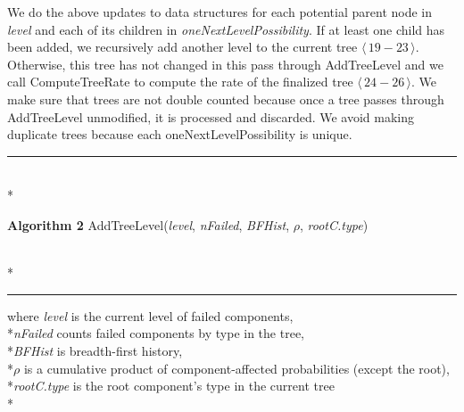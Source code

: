 \documentclass[12pt]{article}
\newcommand{\captionAmerica}[2]{\noindent\hrLine\vspace{-0.25em}\\*{\raggedright\textbf{Algorithm #1} #2}\vspace{-0.8em}\\*\hrLine}
\newcommand{\hrLine}{\hspace{\fill}\rule{1.0\linewidth}{0.7pt}\hspace{\fill}}
\newcommand{\varName}[1]{\textrm{\it#1}}
\newcommand{\citeBlock}[2]{$\langle \, #1 - #2 \, \rangle$}
\begin{document}
We do the above updates to data structures for each potential parent node in \varName{level} and each of its children in \varName{oneNextLevelPossibility}. If at least one child has been added, we recursively add another level to the current tree \citeBlock{19}{23}. Otherwise, this tree has not changed in this pass through AddTreeLevel and we call ComputeTreeRate to compute the rate of the finalized tree \citeBlock{24}{26}. We make sure that trees are not double counted because once a tree passes through AddTreeLevel unmodified, it is processed and discarded. We avoid making duplicate trees because each oneNextLevelPossibility is unique.

\captionAmerica{2}{AddTreeLevel(\varName{level}, \varName{nFailed}, \varName{BFHist}, $\rho$, \varName{rootC.type})}
where \varName{level} is the current level of failed components, \\*\varName{nFailed} counts failed components by type in the tree, \\*\varName{BFHist} is breadth-first history, \\*$\rho$ is a cumulative product of component-affected probabilities (except the root), \\*\varName{rootC.type} is the root component's type in the current tree
\\*\vspace{0.8em}
\end{document}
